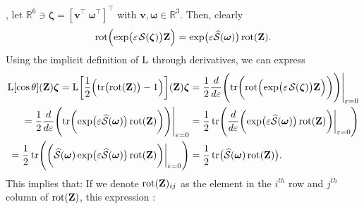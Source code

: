 , let $\mathbb{R}^6\ni\boldsymbol{\zeta} = [\mathbf{v}^\top\ \boldsymbol{\omega}^\top]^\top$ with $\mathbf{v}, \boldsymbol{\omega}\in\mathbb{R}^3$. Then, clearly
\begin{align}
    \rot\Bigl(\exp\bigl(\varepsilon\SL[\boldsymbol{\zeta}]\bigr)\mathbf{Z}\Bigr) = \exp\bigl(\varepsilon\widehat{\mathcal{S}}(\boldsymbol{\omega})\bigr)\rot(\mathbf{Z}). 
\end{align}
Using the implicit definition of $\operatorname{L}$ through derivatives, we can express
\begin{align}
   \begin{split}
     \Lop[\cos\theta](\mathbf{Z})\boldsymbol{\zeta}=\Lop\biggl[\frac{1}{2}\Bigl(\tr\bigl(\rot(\mathbf{Z})\bigr)-1\Bigr)\biggr](\mathbf{Z})\boldsymbol{\zeta} &= \frac{1}{2}\frac{d}{d\varepsilon}\Biggl(\tr\biggl(\rot\Bigl(\exp\bigl(\varepsilon\SL[\boldsymbol{\zeta}]\bigr)\mathbf{Z}\Bigr)\biggr)\Biggr)\Biggr|_{\varepsilon=0}\\
     = \frac{1}{2}\frac{d}{d\varepsilon}\Biggl(\tr\biggl(\exp\bigl(\varepsilon\widehat{\mathcal{S}}(\boldsymbol{\omega})\bigr)\rot(\mathbf{Z})\biggr)\Biggr)\Biggr|_{\varepsilon=0}
     &= \frac{1}{2}\tr\Biggl(\frac{d}{d\varepsilon}\biggl(\exp\bigl(\varepsilon\widehat{\mathcal{S}}(\boldsymbol{\omega})\bigr)\rot(\mathbf{Z})\biggr)\biggr|_{\varepsilon=0}\Biggr)\\
     = \frac{1}{2}\tr\Biggl(\biggl(\widehat{\mathcal{S}}(\boldsymbol{\omega})\exp\bigl(\varepsilon\widehat{\mathcal{S}}(\boldsymbol{\omega})\bigr)\rot(\mathbf{Z})\biggr)\biggr|_{\varepsilon=0}\Biggr)
     &= \frac{1}{2}\tr\bigl(\widehat{\mathcal{S}}(\boldsymbol{\omega})\rot(\mathbf{Z})\bigr).
   \end{split}
\end{align}
This implies that:
If we denote $\operatorname{rot}(\mathbf{Z})_{ij}$ as the element in the $i^{th}$ row and $j^{th}$ column of $\operatorname{rot}(\mathbf{Z})$, this expression :

